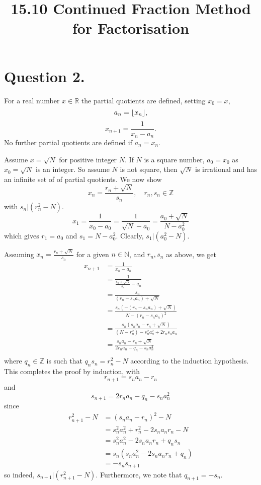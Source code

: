 \documentclass{article}
\title{15.10 Continued Fraction Method for Factorisation}
\newcommand{\R}{\mathbb R}
\newcommand{\N}{\mathbb N}
\newcommand{\Z}{\mathbb Z}
\DeclarePairedDelimiter\floor{\lfloor}{\rfloor}
\begin{document}
\maketitle

\section*{Question 2.}
For a real number $x\in \R$ the partial quotients are defined, setting $x_0=x$,
$$a_n = \floor*{x_n},$$
$$x_{n+1} = \frac1{x_n - a_n}.$$
No further partial quotients are defined if $a_n = x_n$.

Assume $x=\sqrt N$ for positive integer $N$. 
If $N$ is a square number, $a_0=x_0$ as $x_0=\sqrt N$ is an integer.
So assume $N$ is not square, then $\sqrt N$ is irrational and has an infinite set of of partial quotients. 
We now show $$x_n = \frac{r_n + \sqrt N}{s_n}, \quad r_n, s_n \in \Z$$
with $s_n | (r_n^2-N)$.
$$x_1=\frac 1{x_0-a_0} 
= \frac 1{\sqrt N - a_0} 
= \frac {a_0 + \sqrt N}{N-a_0^2}$$
which gives $r_1 = a_0$ and $s_1=N-a_0^2.$
Clearly, $s_1 | (a_0^2-N)$.

Assuming $x_n = \frac{r_n + \sqrt N}{s_n}$ for a given $n\in \N$, and $r_n, s_n$ as above, we get
\begin{align*}
x_{n+1} &= \frac 1{x_n - a_n} \\
&= \frac 1{\frac{r_n+ \sqrt N}{s_n}-a_n}\\
&= \frac {s_n}{(r_n - s_na_n) +  \sqrt N} \\
&= \frac {s_n(-(r_n-s_na_n) + \sqrt N)}{N - (r_n-s_na_n)^2}\\
&= \frac {s_n(s_na_n-r_n + \sqrt N)}{(N - r_n^2)-s_n^2a_n^2+2r_ns_na_n}\\
&= \frac {s_na_n-r_n + \sqrt N}{2r_na_n-q_n-s_na_n^2}\\
\end{align*}
where $q_n\in \Z$ is such that $q_ns_n=r_n^2-N$ according to the induction hypothesis. 
This completes the proof by induction, with
\begin{equation}\label{rn}
r_{n+1} = s_na_n-r_n
\end{equation}
and 
\begin{equation}\label{sn}
s_{n+1} = 2r_na_n-q_n-s_na_n^2
\end{equation}
since 
\begin{align*}
r_{n+1}^2-N &= (s_na_n-r_n)^2 - N \\
&= s_n^2a_n^2 + r_n^2 - 2s_na_nr_n - N \\
&= s_n^2a_n^2 - 2s_na_nr_n + q_ns_n \\
&= s_n(s_na_n^2  - 2s_na_nr_n + q_n) \\
&= -s_ns_{n+1}
\end{align*}
so indeed, $s_{n+1}|(r_{n+1}^2-N)$. 
Furthermore, we note that $q_{n+1}=-s_n$.
\end{document}
